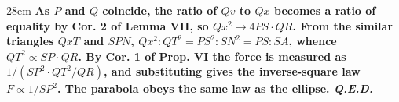 \documentclass[border=4pt]{standalone}
\begin{document}
\begin{varwidth}{28em}
\large\bfseries
As $P$ and $Q$ coincide, the ratio of $Qv$ to $Qx$ becomes a ratio of equality by      Cor. 2 of Lemma VII, so $Qx^2 \to 4PS \cdot QR$. From the similar triangles $QxT$ and      $SPN$, $Qx^2 : QT^2 = PS^2 : SN^2 = PS : SA$, whence $QT^2 \propto SP \cdot QR$.      By Cor. 1 of Prop. VI the force is measured as $1/(SP^2 \cdot QT^2/QR)$, and substituting      gives the inverse-square law $F \propto 1/SP^2$. The parabola obeys the same      law as the ellipse. \textit{Q.E.D.}
\end{varwidth}
\end{document}
